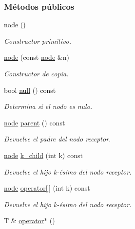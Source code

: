 \subsubsection*{Métodos públicos}
\begin{DoxyCompactItemize}
\item 
\hyperlink{classktree_1_1node_aff14a1950afbf6628cee63304b57b4ee}{node} ()
\begin{DoxyCompactList}\small\item\em Constructor primitivo. \end{DoxyCompactList}\item 
\hyperlink{classktree_1_1node_aad2bdc12654b870021c8177673523634}{node} (const \hyperlink{classktree_1_1node}{node} \&n)
\begin{DoxyCompactList}\small\item\em Constructor de copia. \end{DoxyCompactList}\item 
bool \hyperlink{classktree_1_1node_ad1fb93f739663851a23f1181848da87a}{null} () const 
\begin{DoxyCompactList}\small\item\em Determina si el nodo es nulo. \end{DoxyCompactList}\item 
\hyperlink{classktree_1_1node}{node} \hyperlink{classktree_1_1node_ac985d04cae9a8b6a5137aff15f742e3a}{parent} () const 
\begin{DoxyCompactList}\small\item\em Devuelve el padre del nodo receptor. \end{DoxyCompactList}\item 
\hyperlink{classktree_1_1node}{node} \hyperlink{classktree_1_1node_adcb69c2caed252b51d400f4237c1f472}{k\+\_\+child} (int k) const 
\begin{DoxyCompactList}\small\item\em Devuelve el hijo k-\/ésimo del nodo receptor. \end{DoxyCompactList}\item 
\hyperlink{classktree_1_1node}{node} \hyperlink{classktree_1_1node_a1e239875402ddda4c995cc33cfe0298c}{operator\mbox{[}$\,$\mbox{]}} (int k) const 
\begin{DoxyCompactList}\small\item\em Devuelve el hijo k-\/ésimo del nodo receptor. \end{DoxyCompactList}\item 
T \& \hyperlink{classktree_1_1node_a92176b783e04a960348e765d58bff42a}{operator$\ast$} ()

\end{DoxyCompactItemize}
